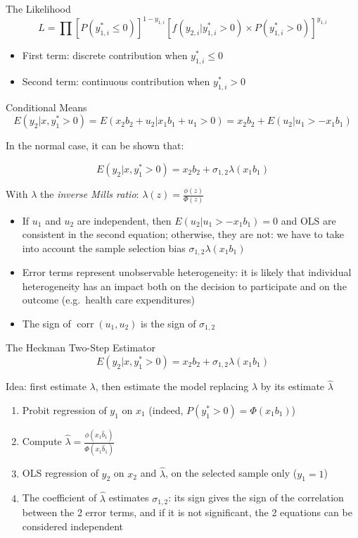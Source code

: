 \documentclass[aspectratio=169]{beamer}
\begin{document}
\begin{frame}{The Likelihood}
\[L = \prod[P(y_{1,i}^* \leq 0)]^{1-y_{1,i}}[f(y_{2,i}|y_{1,i}^* > 0) \times P(y_{1,i}^* > 0)]^{y_{1,i}}\]

\begin{itemize}
    \item First term: discrete contribution when $y_{1,i}^* \leq 0$
    \item Second term: continuous contribution when $y_{1,i}^* > 0$
\end{itemize}
\end{frame}

\begin{frame}{Conditional Means}
\[E(y_2|x, y_1^* > 0) = E(x_2 b_2 + u_2|x_1 b_1 + u_1 > 0) = x_2 b_2 + E(u_2|u_1 > -x_1 b_1)\]

In the normal case, it can be shown that:

\[E(y_2|x, y_1^* > 0) = x_2 b_2 + \sigma_{1,2}\lambda(x_1 b_1)\]

With $\lambda$ the \textit{inverse Mills ratio}: $\lambda(z) = \frac{\phi(z)}{\Phi(z)}$

\begin{itemize}
    \item If $u_1$ and $u_2$ are independent, then $E(u_2|u_1 > -x_1 b_1) = 0$ and OLS are consistent in the second equation; otherwise, they are not: we have to take into account the sample selection bias $\sigma_{1,2}\lambda(x_1 b_1)$
    \item Error terms represent unobservable heterogeneity: it is likely that individual heterogeneity has an impact both on the decision to participate and on the outcome (e.g.\ health care expenditures)
    \item The sign of $\operatorname{corr}(u_1, u_2)$ is the sign of $\sigma_{1,2}$
\end{itemize}
\end{frame}

\begin{frame}{The Heckman Two-Step Estimator}
\[E(y_2|x, y_1^* > 0) = x_2 b_2 + \sigma_{1,2}\lambda(x_1 b_1)\]

Idea: first estimate $\lambda$, then estimate the model replacing $\lambda$ by its estimate $\hat{\lambda}$

\begin{enumerate}
    \item Probit regression of $y_1$ on $x_1$ (indeed, $P(y_1^* > 0) = \Phi(x_1 b_1)$)
    \item Compute $\hat{\lambda} = \frac{\phi(x_1 \hat{b}_1)}{\Phi(x_1 \hat{b}_1)}$
    \item OLS regression of $y_2$ on $x_2$ and $\hat{\lambda}$, on the selected sample only ($y_1 = 1$)
    \item The coefficient of $\hat{\lambda}$ estimates $\sigma_{1,2}$: its sign gives the sign of the correlation between the 2 error terms, and if it is not significant, the 2 equations can be considered independent
\end{enumerate}
\end{frame}
\end{document}

